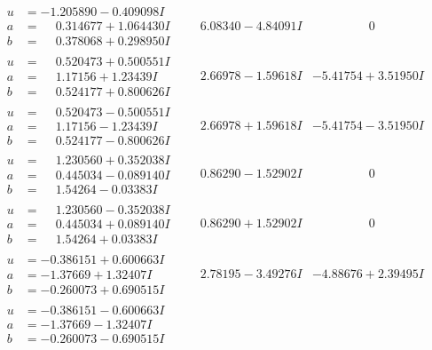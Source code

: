 \documentclass[1p]{elsarticle_modified}
\theoremstyle{definition}
\begin{document}
$$\begin{array}{c|c|c}
\begin{aligned}
u &= -1.205890 - 0.409098 I \\
a &= \phantom{-}0.314677 + 1.064430 I \\
b &= \phantom{-}0.378068 + 0.298950 I\end{aligned}
 & \phantom{-}6.08340 - 4.84091 I & \phantom{-0.000000 } 0 \\ \hline\begin{aligned}
u &= \phantom{-}0.520473 + 0.500551 I \\
a &= \phantom{-}1.17156 + 1.23439 I \\
b &= \phantom{-}0.524177 + 0.800626 I\end{aligned}
 & \phantom{-}2.66978 - 1.59618 I & -5.41754 + 3.51950 I \\ \hline\begin{aligned}
u &= \phantom{-}0.520473 - 0.500551 I \\
a &= \phantom{-}1.17156 - 1.23439 I \\
b &= \phantom{-}0.524177 - 0.800626 I\end{aligned}
 & \phantom{-}2.66978 + 1.59618 I & -5.41754 - 3.51950 I \\ \hline\begin{aligned}
u &= \phantom{-}1.230560 + 0.352038 I \\
a &= \phantom{-}0.445034 - 0.089140 I \\
b &= \phantom{-}1.54264 - 0.03383 I\end{aligned}
 & \phantom{-}0.86290 - 1.52902 I & \phantom{-0.000000 } 0 \\ \hline\begin{aligned}
u &= \phantom{-}1.230560 - 0.352038 I \\
a &= \phantom{-}0.445034 + 0.089140 I \\
b &= \phantom{-}1.54264 + 0.03383 I\end{aligned}
 & \phantom{-}0.86290 + 1.52902 I & \phantom{-0.000000 } 0 \\ \hline\begin{aligned}
u &= -0.386151 + 0.600663 I \\
a &= -1.37669 + 1.32407 I \\
b &= -0.260073 + 0.690515 I\end{aligned}
 & \phantom{-}2.78195 - 3.49276 I & -4.88676 + 2.39495 I \\ \hline\begin{aligned}
u &= -0.386151 - 0.600663 I \\
a &= -1.37669 - 1.32407 I \\
b &= -0.260073 - 0.690515 I\end{aligned}

\end{array}$$
\end{document}
